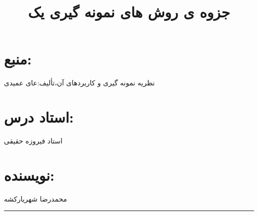	\title{جزوه ی روش های نمونه گیری یک}
\maketitle
{}
\section*{منبع:}
نظریه نمونه گیری و کاربردهای آن،تألیف:عای عمیدی
\section*{استاد درس:}
استاد فیروزه حقیقی
\section*{نویسنده:}
محمدرضا شهریارکشه
\\
\rule{\textwidth}{0.4pt}
